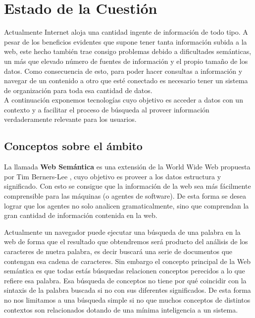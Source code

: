 \chapter{Estado de la Cuestión}
\label{cap:estadoDeLaCuestion}

Actualmente Internet aloja una cantidad ingente de información de todo tipo. A pesar de los beneficios evidentes que supone tener tanta información subida a la web, este hecho también trae consigo problemas debido a dificultades semánticas, un más que elevado número de fuentes de información y el propio tamaño de los datos. Como consecuencia de esto, para poder hacer consultas a información y navegar de un contenido a otro que esté conectado es necesario tener un sistema de organización para toda esa cantidad de datos.\\

A continuación exponemos tecnologías cuyo objetivo es acceder a datos con un contexto y a facilitar el proceso de búsqueda al proveer información verdaderamente relevante para los usuarios.\\

\section{Conceptos sobre el ámbito}

La llamada \textbf{Web Semántica} es una extensión de la World Wide Web propuesta por Tim Berners-Lee \cite{berners2001}, cuyo objetivo es proveer a los datos estructura y significado. Con esto se consigue que la información de la web sea más fácilmente comprensible para las máquinas (o agentes de software). De esta forma se desea lograr que los agentes no solo analicen gramaticalmente, sino que comprendan la gran cantidad de información contenida en la web. 


Actualmente un navegador puede ejecutar una búsqueda de una palabra en la web de forma que el resultado que obtendremos será producto del análisis de los caracteres de nuetra palabra, es decir buscará una serie de documentos que contengan esa cadena de caracteres. Sin embargo el concepto principal de la Web semántica es que todas estás búsquedas relacionen conceptos perecidos a lo que refiere esa palabra. Esa búsqueda de conceptos no tiene por qué coincidir con la sintaxis de la palabra buscada si no con sus diferentes significados. De esta forma no nos limitamos a una búsqueda simple si no que muchos conceptos de distintos contextos son relacionados dotando de una mínima inteligencia a un sistema\cite{CODINA, Lluís; ROVIRA, Cristòfol. La web semántica. En Tendencias en documentación digital. Trea, 2006.}.\\

